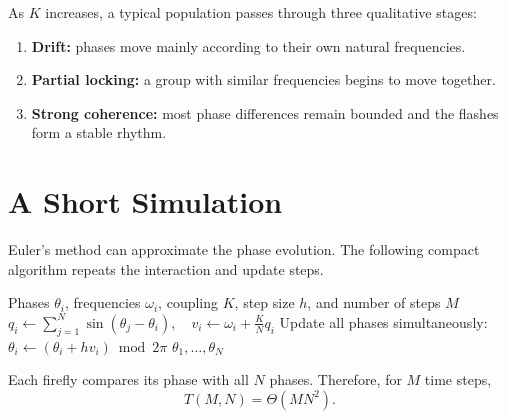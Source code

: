 \documentclass[11pt]{article}
\begin{document}
As $K$ increases, a typical population passes through three qualitative stages:
\begin{enumerate}[label=\Roman*.]
    \item \textcolor{stagered}{\textbf{Drift:}} phases move mainly according to
          their own natural frequencies.
    \item \textcolor{stagered}{\textbf{Partial locking:}} a group with similar
          frequencies begins to move together.
    \item \textcolor{stagered}{\textbf{Strong coherence:}} most phase differences
          remain bounded and the flashes form a stable rhythm.
\end{enumerate}

\section{A Short Simulation}
Euler's method can approximate the phase evolution. The following compact
algorithm repeats the interaction and update steps.

\begin{algorithm}[ht]
    \caption{Simulate the Kuramoto model}
    \begin{algorithmic}[1]
        \Require Phases $\theta_i$, frequencies $\omega_i$, coupling $K$, step
                 size $h$, and number of steps $M$
                \State $q_i \gets \displaystyle\sum_{j=1}^{N}\sin(\theta_j-\theta_i),
                        \quad v_i \gets \omega_i + \frac{K}{N} q_i$
            \EndFor
            \State Update all phases simultaneously:
                   $\theta_i \gets (\theta_i + h v_i) \bmod 2\pi$
        \EndFor
        \State \Return $\theta_1,\dots,\theta_N$
    \end{algorithmic}
\end{algorithm}

Each firefly compares its phase with all $N$ phases. Therefore, for $M$ time
steps,
\begin{equation}
    T(M,N) = \Theta(MN^2).
\end{equation}

\end{document}
